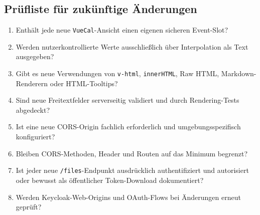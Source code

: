 \subsection{Prüfliste für zukünftige Änderungen}

\begin{enumerate}
  \item Enthält jede neue \texttt{VueCal}-Ansicht einen eigenen
    sicheren Event-Slot?
  \item Werden nutzerkontrollierte Werte ausschließlich über
    Interpolation als Text ausgegeben?
  \item Gibt es neue Verwendungen von \texttt{v-html},
    \texttt{innerHTML}, Raw HTML, Markdown-Renderern oder HTML-Tooltips?
  \item Sind neue Freitextfelder serverseitig validiert und durch
    Rendering-Tests abgedeckt?
  \item Ist eine neue CORS-Origin fachlich erforderlich und
    umgebungsspezifisch konfiguriert?
  \item Bleiben CORS-Methoden, Header und Routen auf das Minimum begrenzt?
  \item Ist jeder neue \texttt{/files}-Endpunkt ausdrücklich
    authentifiziert und autorisiert oder bewusst als öffentlicher
    Token-Download dokumentiert?
  \item Werden Keycloak-Web-Origins und OAuth-Flows bei Änderungen
    erneut geprüft?
\end{enumerate}
